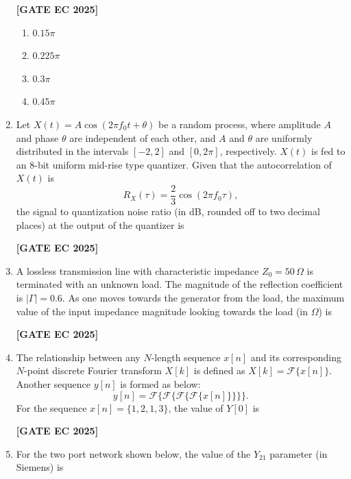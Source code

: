 \documentclass[12pt]{article}
\begin{document}
\begin{enumerate}[leftmargin=1.5em, label=\textbf{Q.\arabic*}., itemsep=2em]
\noindent \textbf{[GATE EC 2025]}
\begin{multicols}{2}
\begin{enumerate}
    \item $0.15\pi$
    \item $0.225\pi$
    \item $0.3\pi$
    \item $0.45\pi$
\end{enumerate}
\end{multicols}

\item Let $X(t) = A\cos(2\pi f_0 t + \theta)$ be a random process, where amplitude $A$ and phase $\theta$ are independent of each other, and $A$ and $\theta$ are uniformly distributed in the intervals $[-2,2]$ and $[0,2\pi]$, respectively. $X(t)$ is fed to an 8-bit uniform mid-rise type quantizer. Given that the autocorrelation of $X(t)$ is
\[
R_X(\tau) = \frac{2}{3}\cos(2\pi f_0 \tau),
\]
the signal to quantization noise ratio (in dB, rounded off to two decimal places) at the output of the quantizer is

\noindent \textbf{[GATE EC 2025]}

\item A lossless transmission line with characteristic impedance $Z_0 = 50 \,\Omega$ is terminated with an unknown load. The magnitude of the reflection coefficient is $|\Gamma| = 0.6$. As one moves towards the generator from the load, the maximum value of the input impedance magnitude looking towards the load (in $\Omega$) is

\noindent \textbf{[GATE EC 2025]}

\item The relationship between any $N$-length sequence $x[n]$ and its corresponding $N$-point discrete Fourier transform $X[k]$ is defined as $X[k] = \mathcal{F}\{x[n]\}$. Another sequence $y[n]$ is formed as below:
\[
y[n] = \mathcal{F}\{\mathcal{F}\{\mathcal{F}\{\mathcal{F}\{x[n]\}\}\}\}.
\]
For the sequence $x[n] = \{1,2,1,3\}$, the value of $Y[0]$ is

\noindent \textbf{[GATE EC 2025]}

\item For the two port network shown below, the value of the $Y_{21}$ parameter (in Siemens) is


\end{enumerate}
\end{document}
